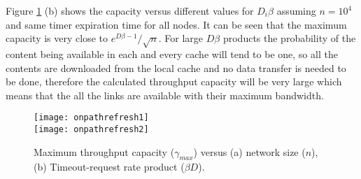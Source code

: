 \documentclass[journal]{IEEEtran}
\theoremstyle{plain}
\theoremstyle{remark}
\begin{document}
Figure \ref{fig:onpath} (b) shows the capacity versus different values for $D_i\beta$ assuming $n=10^4$ and same timer expiration time for all nodes. It can be seen that the maximum capacity is very close to $e^{D\beta-1}/\sqrt{n}$. For large $D\beta$ products the probability of the content being available in each and every cache will tend to be one, so all the contents are downloaded from the local cache and no data transfer is needed to be done, therefore the calculated throughput capacity will be very large which means that the all the links are available with their maximum bandwidth.


\begin{figure}[http]
    \center
       \texttt{[image: onpathrefresh1]}\\
			 \texttt{[image: onpathrefresh2]}\\
      \caption{Maximum throughput capacity ($\gamma_{max}$) versus (a) network size ($n$), (b) Timeout-request rate product ($\beta D$).}
    \label{fig:onpath}
\end{figure}
\end{document}
